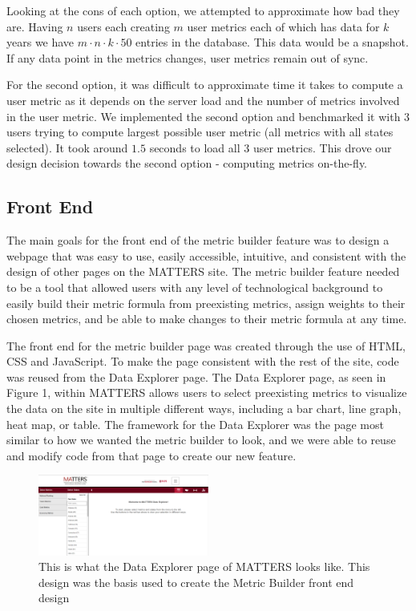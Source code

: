 		Looking at the cons of each option, we attempted to approximate how bad they are. Having $n$ users each creating $m$ user metrics each of which has data for $k$ years we have $m \cdot n \cdot k \cdot 50$ entries in the database. This data would be a snapshot. If any data point in the metrics changes, user metrics remain out of sync.

		For the second option, it was difficult to approximate time it takes to compute a user metric as it depends on the server load and the number of metrics involved in the user metric. We implemented the second option and benchmarked it with $3$ users trying to compute largest possible user metric (all metrics with all states selected). It took around $1.5$ seconds to load all $3$ user metrics. This drove our design decision towards the second option - computing metrics on-the-fly.

	\subsection{Front End}
	
	The main goals for the front end of the metric builder feature was to design a webpage that was easy to use, easily accessible, intuitive, and consistent with the design of other pages on the MATTERS site. The metric builder feature needed to be a tool that allowed users with any level of technological background to easily build their metric formula from preexisting metrics, assign weights to their chosen metrics, and be able to make changes to their metric formula at any time.
	
	The front end for the metric builder page was created through the use of HTML, CSS and JavaScript. To make the page consistent with the rest of the site, code was reused from the Data Explorer page. The Data Explorer page, as seen in Figure 1, within MATTERS allows users to select preexisting metrics to visualize the data on the site in multiple different ways, including a bar chart, line graph, heat map, or table. The framework for the Data Explorer was the page most similar to how we wanted the metric builder to look, and we were able to reuse and modify code from that page to create our new feature. 
	
	\begin{figure}[!ht]
		\centering
			\includegraphics[width=0.5\textwidth]{images/dataexplorer.png}
		\caption{This is what the Data Explorer page of MATTERS looks like. This design was the basis used to create the Metric Builder front end design}
	\end{figure}
	
